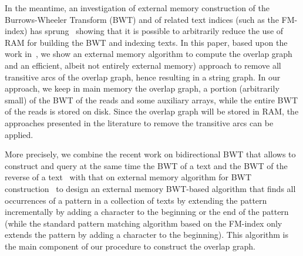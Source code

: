 \documentclass[runningheads,envcountsame,a4paper]{llncs}
\begin{document}
In the meantime, an investigation of external memory construction of the
Burrows-Wheeler Transform (BWT) and of related text indices (such as the
FM-index) has sprung~\cite{Bauer2011,Bauer2013,Ferragina2012} showing that it is possible to
arbitrarily reduce the use of RAM for building the BWT and indexing texts.
In this paper, based upon the work in~\cite{Bauer2011}, we show an external
memory algorithm to compute the overlap graph and an efficient, albeit not
entirely external memory) approach to remove all transitive arcs of the overlap
graph, hence resulting in a string graph.
%
%
In our approach, we keep in main memory the overlap graph, a portion (arbitrarily small)
of the BWT of the reads and some auxiliary arrays, while the entire BWT of the reads is stored on disk.
Since the overlap graph will be stored in RAM, the approaches presented in the
literature to remove the transitive arcs can be applied.


More precisely, we combine the recent work on bidirectional BWT that allows to
construct and query at the same time the BWT of a text and the BWT of the
reverse of a text~\cite{Lam2009} with that on external memory algorithm for BWT
construction~\cite{Bauer2011} to design an external memory BWT-based algorithm
that finds all occurrences of a pattern in a collection of texts by extending
the pattern incrementally by adding a character to the beginning or the end of
the pattern (while the standard pattern matching algorithm based on the FM-index
only extends the pattern by adding a character to the beginning).
This algorithm is the main component of our procedure to construct the overlap graph.
\end{document}
